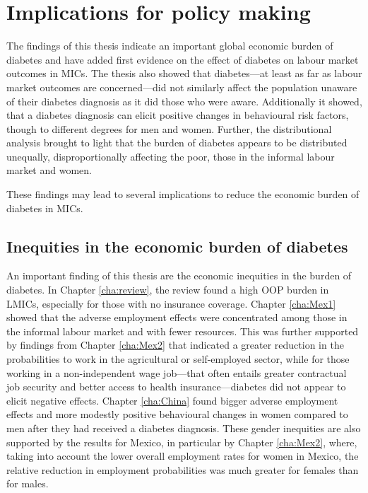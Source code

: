 \section{Implications for policy making}

The findings of this thesis indicate an important global economic burden of diabetes and have added first evidence on the effect of diabetes on labour market outcomes in \acp{MIC}. The thesis also showed that diabetes---at least as far as labour market outcomes are concerned---did not similarly affect the population unaware of their diabetes diagnosis as it did those who were aware. Additionally it showed, that a diabetes diagnosis can elicit positive changes in behavioural risk factors, though to different degrees for men and women. Further, the distributional analysis brought to light that the burden of diabetes appears to be distributed unequally, disproportionally affecting the poor, those in the informal labour market and women.

These findings may lead to several implications to reduce the economic burden of diabetes in \acp{MIC}. 

\subsection{Inequities in the economic burden of diabetes}

An important finding of this thesis are the economic inequities in the burden of diabetes. In Chapter \ref{cha:review}, the review found a high \ac{OOP} burden in \acp{LMIC}, especially for those with no insurance coverage. Chapter \ref{cha:Mex1} showed that the adverse employment effects were concentrated among those in the informal labour market and with fewer resources. This was further supported by findings from Chapter \ref{cha:Mex2} that indicated a greater reduction in the probabilities to work in the agricultural or self-employed sector, while for those working in a non-independent wage job---that often entails greater contractual job security and better access to health insurance---diabetes did not appear to elicit negative effects. Chapter \ref{cha:China} found bigger adverse employment effects and more modestly positive behavioural changes in women compared to men after they had received a diabetes diagnosis. These gender inequities are also supported by the results for Mexico, in particular by Chapter \ref{cha:Mex2}, where, taking into account the lower overall employment rates for women in Mexico, the relative reduction in employment probabilities was much greater for females than for males.

